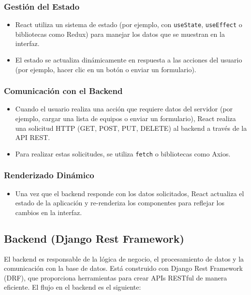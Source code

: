 \documentclass{report}
\begin{document}
    \subsubsection*{Gestión del Estado}
    \begin{itemize}
        \item React utiliza un sistema de estado (por ejemplo, con \texttt{useState}, \texttt{useEffect} o bibliotecas como Redux) para manejar los datos que se muestran en la interfaz.
        \item El estado se actualiza dinámicamente en respuesta a las acciones del usuario (por ejemplo, hacer clic en un botón o enviar un formulario).
    \end{itemize}
    
    \subsubsection*{Comunicación con el Backend}
    \begin{itemize}
        \item Cuando el usuario realiza una acción que requiere datos del servidor (por ejemplo, cargar una lista de equipos o enviar un formulario), React realiza una solicitud HTTP (GET, POST, PUT, DELETE) al backend a través de la API REST.
        \item Para realizar estas solicitudes, se utiliza \texttt{fetch} o bibliotecas como Axios.
    \end{itemize}
    
    \subsubsection*{Renderizado Dinámico}
    \begin{itemize}
        \item Una vez que el backend responde con los datos solicitados, React actualiza el estado de la aplicación y re-renderiza los componentes para reflejar los cambios en la interfaz.
    \end{itemize}
    
    \subsection*{Backend (Django Rest Framework)}
    El backend es responsable de la lógica de negocio, el procesamiento de datos y la comunicación con la base de datos. Está construido con Django Rest Framework (DRF), que proporciona herramientas para crear APIs RESTful de manera eficiente. El flujo en el backend es el siguiente:
    
\end{document}
